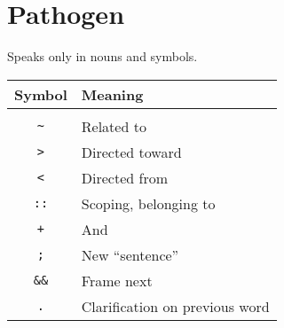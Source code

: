 \section{Pathogen}

Speaks only in nouns and symbols.

\begin{tabular}{|c|l|}
  \hline
  Symbol & Meaning \\
  \hline & \\
  \verb!~! & Related to \\
  \verb!>! & Directed toward \\
  \verb!<! & Directed from \\
  \verb!::! & Scoping, belonging to \\
  \verb!+! & And \\
  \verb!;! & New ``sentence'' \\
  \verb!&&! & Frame next \\
  \verb!.! & Clarification on previous word \\
  \hline
\end{tabular}

